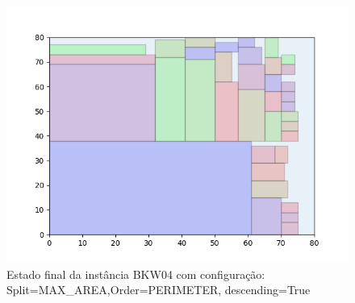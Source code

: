 \begin{figure}[H]
    \centering
    \caption[]{Estado final da instância BKW04 com configuração: Split=MAX_AREA,Order=PERIMETER, descending=True}
    \label{fig:bkw04-max_area-perimeter-true}
    \includegraphics[scale=0.5]{output/figures/bkw/bkw04/max_area/perimeter/true/00}
\end{figure}